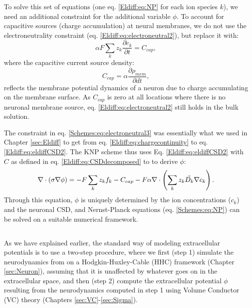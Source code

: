 To solve this set of equations (one eq. \ref{Eldiff:eq:NP} for each ion species $k$), we need an additional constraint for the additional variable $\phi$. To account for capacitive sources (charge accumulation) at neural membranes, we do not use the electroneutrality constraint (eq. \ref{Eldiff:eq:electroneutral2}), but replace it with:
\begin{equation}
\alpha F \sum_k{z_k \frac{\partial c_k}{\partial t}} = C_{cap},
\label{Schemes:eq:electroneutral3}
\end{equation}
where the capacitive current source density:
\begin{equation}
C_{cap} = {\alpha}\frac{\partial \rho_{mem}}{\partial dt},
\label{Schemes:eq:Andreas}
\end{equation}
reflects the membrane potential dynamics of a neuron due to charge accumulating on the membrane surface. As $C_{cap}$ is zero at all locations where there is no neuronal membrane source, eq. \ref{Eldiff:eq:electroneutral2} still holds in the bulk solution.

The constraint in eq. \ref{Schemes:eq:electroneutral3} was essentially what we used in Chapter \ref{sec:Eldiff} to get from eq. \ref{Eldiff:eq:chargecontinuity} to eq. \ref{Eldiff:eq:eldiffCSD2}. The KNP scheme thus uses Eq. \ref{Eldiff:eq:eldiffCSD2} with $C$ as defined in eq.  \ref{Eldiff:eq:CSDdecomposed} to to derive $\phi$:
\begin{equation}
\nabla \cdot (\sigma\nabla\phi) = - F \sum_k z_k f_k -  C_{cap} - F\alpha \nabla \cdot \left (\sum_k{z_k \tilde{D_k}{\bf \nabla} c_{k}} \right).
\label{Schemes:eq:KNPfinal}
\end{equation}
Through this equation, $\phi$ is uniquely determined by the ion concentrations ($c_k$) and the neuronal CSD, and Nernst-Planck equations (eq. \ref{Schemes:eq:NP}) can be solved on a suitable numerical framework.

\subsection{}
\label{sec:Schemes:VC}

As we have explained earlier, the standard way of modeling extracellular potentials is to use a two-step procedure, where we first (step 1) simulate the neurodynamics from on a Hodgkin-Huxley-Cable (HHC) framework (Chapter \ref{sec:Neuron}), assuming that it is unaffected by whatever goes on in the extracellular space, and then (step 2) compute the extracellular potential $\phi$ resulting from the neurodynamics computed in step 1 using Volume Conductor (VC) theory (Chapters \ref{sec:VC}-\ref{sec:Sigma}). 

